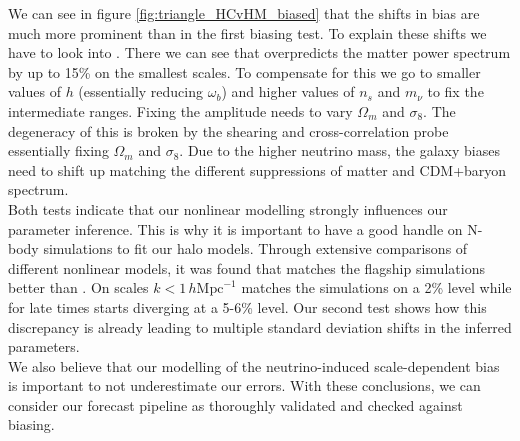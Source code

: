 \documentclass[../main.tex]{subfiles}
\begin{document}
We can see in figure \ref{fig:triangle_HCvHM_biased} that the shifts in bias are much more prominent than in the first biasing test. To explain these shifts we have to look into \cite{Mead:2020vgs}. There we can see that \halofit overpredicts the matter power spectrum by up to 15\% on the smallest scales. To compensate for this we go to smaller values of $h$ (essentially reducing $\omega_b$) and higher values of $n_s$ and $m_\nu$ to fix the intermediate ranges. Fixing the amplitude needs to vary $\Omega_m$ and $\sigma_8$. The degeneracy of this is broken by the shearing and cross-correlation probe essentially fixing $\Omega_m$ and $\sigma_8$. Due to the higher neutrino mass, the galaxy biases need to shift up matching the different suppressions of matter and CDM+baryon spectrum.\\
Both tests indicate that our nonlinear modelling strongly influences our parameter inference. This is why it is important to have a good handle on N-body simulations to fit our halo models. Through extensive comparisons of different nonlinear models, it was found that \hmcode matches the \Euclid flagship simulations better than \halofit \cite{Euclid:2022qde}. On scales $k<1 \,h \mathrm{Mpc}^{-1}$ \hmcode matches the simulations on a 2\% level while \halofit for late times starts diverging at a 5-6\% level. Our second test shows how this discrepancy is already leading to multiple standard deviation shifts in the inferred parameters.\\
We also believe that our modelling of the neutrino-induced scale-dependent bias is important to not underestimate our errors. With these conclusions, we can consider our forecast pipeline as thoroughly validated and checked against biasing. 
\end{document}
